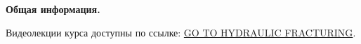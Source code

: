 \documentclass[main.tex]{subfiles}
\begin{document}
\textbf{Общая информация.}

Видеолекции курса доступны по ссылке: \href{https://youtube.com/playlist?list=PLipUmK_65GXEpFTHhfJBaiiv7XiwMg-PM}{GO TO HYDRAULIC FRACTURING}.
\end{document}
